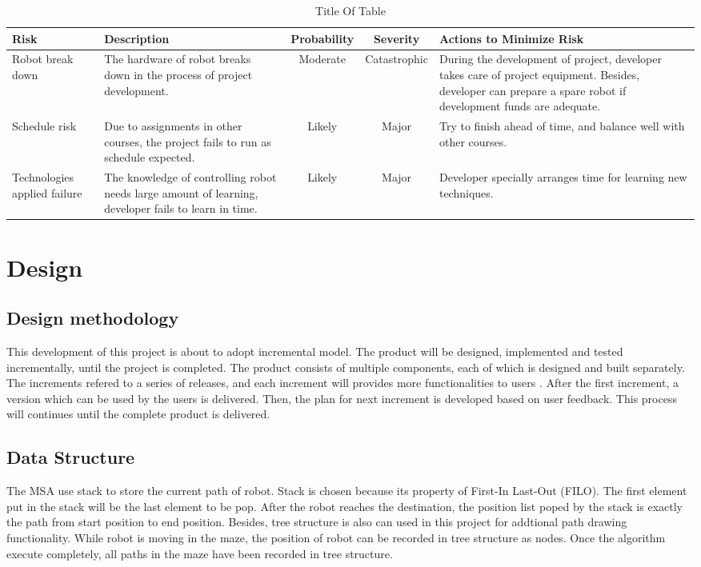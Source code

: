 \documentclass[11pt,times,oneside,openright,hardcopy]{eeereport}
\begin{document}
\begin{table}[h]
\label{tab:tab1}
\centering
\caption{ Title Of Table }
\renewcommand{\arraystretch}{2}
\setlength{\tabcolsep}{10pt}
\begin{tabular}{ | m{2cm} | m{3cm} | c | c | m{3cm} |} 
\hline Risk & Description & Probability & Severity & Actions to Minimize Risk \\ 
\hline Robot break down & The hardware of robot breaks down in the process of project development. & Moderate & Catastrophic & During the development of project, developer takes care of project equipment. Besides, developer can prepare a spare robot if development funds are adequate. \\ 
\hline Schedule risk & Due to assignments in other courses, the project fails to run as schedule expected. & Likely & Major & Try to finish ahead of time, and balance well with other courses. \\ 
\hline Technologies applied failure & The knowledge of controlling robot needs large amount of learning, developer fails to learn in time. & Likely & Major & Developer specially arranges time for learning new techniques. \\ 
\hline 
\end{tabular} 
\end{table}

\chapter{Design}\label{cpt:des}
\section{Design methodology}
This development of this project is about to adopt incremental model. The product will be designed, implemented and tested incrementally, until the project is completed. The product consists of multiple components, each of which is designed and built separately.
The increments refered to a series of releases, and each increment will provides more functionalities to users \cite{Bell:2016vq}. After the first increment, a version which can be used by the users is delivered. Then, the plan for next increment is developed based on user feedback.
This process will continues until the complete product is delivered.

\section{Data Structure}
The MSA use stack to store the current path of robot. Stack is chosen because its property of First-In Last-Out (FILO). The first element put in the stack will be the last element to be pop. After the robot reaches the destination, the position list poped by the stack is exactly the path from start position to end position. 
Besides, tree structure is also can used in this project for addtional path drawing functionality. While robot is moving in the maze, the position of robot can be recorded in tree structure as nodes. Once the algorithm execute completely, all paths in the maze have been recorded in tree structure.
\end{document}

